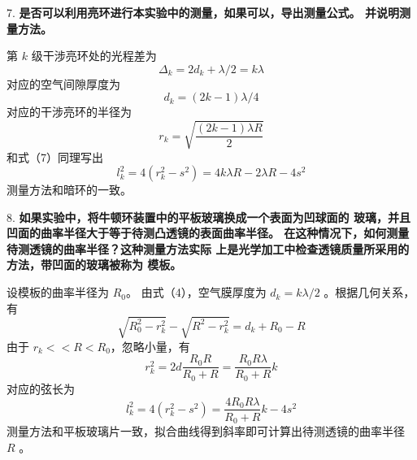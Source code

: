 \documentclass[12pt]{article}
\begin{document}
7. \textbf{是否可以利用亮环进行本实验中的测量，如果可以，导出测量公式。
并说明测量方法。}

第 $k$ 级干涉亮环处的光程差为
\begin{equation}
    \Delta_k=2d_k+\lambda/2=k\lambda
\end{equation}
对应的空气间隙厚度为
\begin{equation}
    d_k=(2k-1)\lambda/4
\end{equation}
对应的干涉亮环的半径为
\begin{equation}
    r_k=\sqrt{\frac{(2k-1)\lambda R}{2}}
\end{equation} 
和式（7）同理写出
\begin{equation}
    l_k^2=4(r_k^2-s^2)=4k\lambda R-2\lambda R -4s^2
\end{equation}
测量方法和暗环的一致。

8. \textbf{如果实验中，将牛顿环装置中的平板玻璃换成一个表面为凹球面的
玻璃，并且凹面的曲率半径大于等于待测凸透镜的表面曲率半径。
在这种情况下，如何测量待测透镜的曲率半径？这种测量方法实际
上是光学加工中检查透镜质量所采用的方法，带凹面的玻璃被称为
模板。}

设模板的曲率半径为 $R_0$。
由式（4），空气膜厚度为 $d_k=k\lambda/2$ 。根据几何关系，有
\begin{equation}
    \sqrt{R_0^2-r_k^2}-\sqrt{R^2-r_k^2}=d_k+R_0-R
\end{equation}
由于 $r_k<<R<R_0$，忽略小量，有
\begin{equation}
    r_k^2=2d\frac{R_0R}{R_0+R}=\frac{R_0R\lambda}{R_0+R}k
\end{equation} 
对应的弦长为
\begin{equation}
    l_k^2=4(r_k^2-s^2)=\frac{4R_0R\lambda}{R_0+R}k-4s^2
\end{equation}
测量方法和平板玻璃片一致，拟合曲线得到斜率即可计算出待测透镜的曲率半径 $R$ 。
\end{document}
